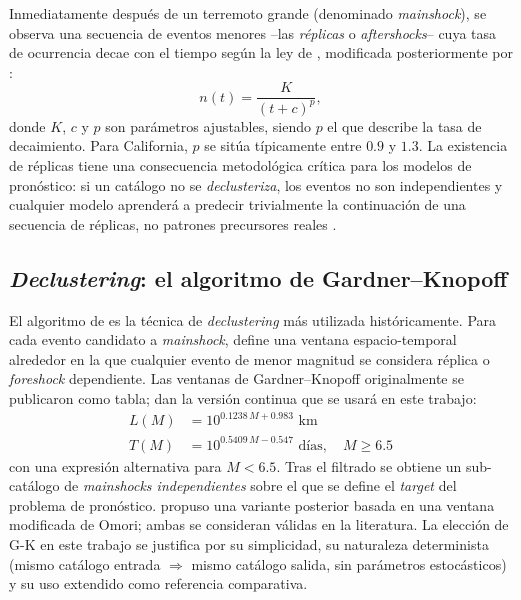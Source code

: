 Inmediatamente después de un terremoto grande (denominado \emph{mainshock}), se observa una secuencia de eventos menores --las \emph{réplicas} o \textit{aftershocks}-- cuya tasa de ocurrencia decae con el tiempo según la ley de \citet{omori1894aftershocks}, modificada posteriormente por \citet{utsu1961statistical}:
\begin{equation}
  n(t) = \frac{K}{(t + c)^p},
  \label{eq:omori}
\end{equation}
donde $K$, $c$ y $p$ son parámetros ajustables, siendo $p$ el que describe la tasa de decaimiento. Para California, $p$ se sitúa típicamente entre $0.9$ y $1.3$. La existencia de réplicas tiene una consecuencia metodológica crítica para los modelos de pronóstico: si un catálogo no se \emph{declusteriza}, los eventos no son independientes y cualquier modelo aprenderá a predecir trivialmente la continuación de una secuencia de réplicas, no patrones precursores reales \citep{vanstiphout2012declustering}.

\subsection{\textit{Declustering}: el algoritmo de Gardner--Knopoff}
\label{declustering}

El algoritmo de \citet{gardner1974poissonian} es la técnica de \textit{declustering} más utilizada históricamente. Para cada evento candidato a \textit{mainshock}, define una ventana espacio-temporal alrededor en la que cualquier evento de menor magnitud se considera réplica o \textit{foreshock} dependiente. Las ventanas de Gardner–Knopoff originalmente se publicaron como tabla; \citet{vanstiphout2012declustering} dan la versión continua que se usará en este trabajo:
\begin{align}
  L(M) & = 10^{0.1238\, M + 0.983}\,\,\mathrm{km} \label{eq:gk-L}                   \\
  T(M) & = 10^{0.5409\, M - 0.547}\,\,\text{días}, \quad M \geq 6.5 \label{eq:gk-T}
\end{align}
con una expresión alternativa para $M < 6.5$. Tras el filtrado se obtiene un sub-catálogo de \emph{mainshocks independientes} sobre el que se define el \emph{target} del problema de pronóstico. \citet{reasenberg1985declustering} propuso una variante posterior basada en una ventana modificada de Omori; ambas se consideran válidas en la literatura. La elección de G-K en este trabajo se justifica por su simplicidad, su naturaleza determinista (mismo catálogo entrada $\Rightarrow$ mismo catálogo salida, sin parámetros estocásticos) y su uso extendido como referencia comparativa.

